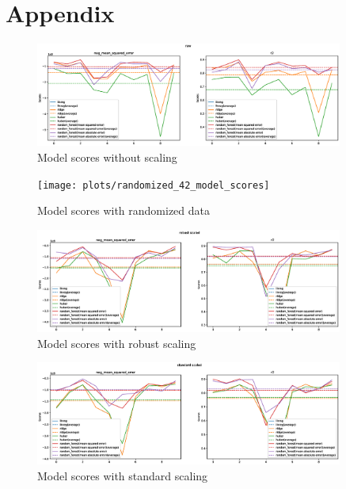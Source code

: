 \documentclass[a4paper,12pt]{article}
\begin{document}
\newpage
\appendix
\section{Appendix}

\begin{figure}[h]
\centering
\includegraphics[width=0.9\textwidth]{plots/raw_model_scores}
\caption{Model scores without scaling}
\end{figure}

\begin{figure}[h]
\centering
\texttt{[image: plots/randomized\_42\_model\_scores]}
\caption{Model scores with randomized data}
\end{figure}

\begin{figure}[h]
\centering
\includegraphics[width=0.9\textwidth]{plots/robust_scaled_model_scores}
\caption{Model scores with robust scaling}
\end{figure}

\begin{figure}[h]
\centering
\includegraphics[width=0.9\textwidth]{plots/standard_scaled_model_scores}
\caption{Model scores with standard scaling}
\end{figure}
\end{document}

